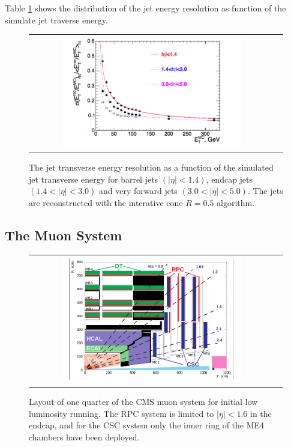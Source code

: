 Table \ref{fig:HCAL_resolution} shows the distribution of the jet energy resolution as function of the simulate jet traverse energy.

\begin{figure}[tbh!]
	\centering
	\begin{tabular}{cc}
		\includegraphics[width=0.75\textwidth]{detector/pics/HCAL_resolution.pdf}
	\end{tabular}
	\caption{The jet transverse energy resolution as a function of the simulated jet transverse energy for barrel jets $(|\eta| < 1.4)$, endcap jets $(1.4 < |\eta| < 3.0)$ and very forward jets $(3.0 < | \eta | < 5.0)$. The jets are reconstructed with the interative cone $R = 0.5$ algorithm.}
	\label{fig:HCAL_resolution}
\end{figure}

\clearpage

\subsection{The Muon System}

\begin{figure}[tbh!]
	\centering
	\begin{tabular}{cc}
		\includegraphics[width=0.75\textwidth]{detector/pics/CMS_muonsys.png}
	\end{tabular}
	\caption{Layout of one quarter of the CMS muon system for initial low luminosity running.
		The RPC system is limited to $|\eta| < 1.6$ in the endcap, and for the CSC system only the inner
		ring of the ME4 chambers have been deployed.}
	\label{fig:CMS_muonsys}
\end{figure}

